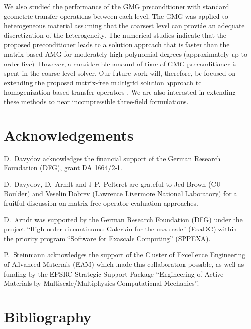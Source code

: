 \documentclass[preprint,12pt,times]{elsarticle}
\begin{document}
We also studied the performance of the GMG preconditioner with standard geometric transfer operations between each level.
The GMG was applied to heterogeneous material assuming that the coarsest level can provide an adequate discretization of the heterogeneity.
The numerical studies indicate that the proposed preconditioner leads to a solution approach that is faster than the matrix-based AMG for moderately high polynomial degrees (approximately up to order five).
However, a considerable amount of time of GMG preconditioner is spent in the coarse level solver.
Our future work will, therefore, be focused on extending the proposed matrix-free multigrid solution approach to homogenization based transfer operators \cite{Miehe2007}.
We are also interested in extending these methods to near incompressible three-field formulations.

\section*{Acknowledgements}

D.~Davydov acknowledges the financial support of the German Research Foundation (DFG), grant DA 1664/2-1.

D.~Davydov, D.~Arndt and J-P.~Pelteret are grateful to Jed Brown (CU Boulder) and Veselin Dobrev (Lawrence Livermore National Laboratory) for a fruitful discussion on matrix-free operator evaluation approaches.

D.~Arndt was supported by the German Research Foundation (DFG) under the project ``High-order discontinuous
Galerkin for the exa-scale'' (\mbox{ExaDG}) within the priority program ``Software
for Exascale Computing'' (SPPEXA).


P.~Steinmann acknowledges the support of the Cluster of Excellence Engineering of Advanced Materials (EAM) which made this collaboration possible, as well as funding by the EPSRC Strategic Support Package ``Engineering of Active Materials by Multiscale/Multiphysics Computational Mechanics''.

\section*{Bibliography}



\end{document}
